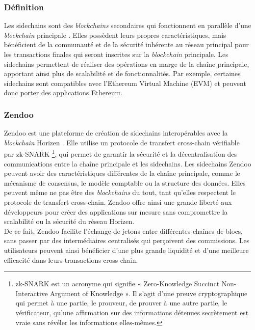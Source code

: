 \subsubsection{Définition}
Les sidechains sont des \textit{blockchains} secondaires qui fonctionnent en parallèle d'une \textit{blockchain} principale \cite{jensen2021introduction,qin2018overview,belchior2022survey}. Elles possèdent leurs propres 
caractéristiques, mais bénéficient de la communauté et de la sécurité inhérente au réseau principal pour les transactions finales qui seront inscrites sur 
la \textit{blockchain} principale. Les sidechains permettent de réaliser des opérations en marge de la chaîne principale, apportant ainsi plus de scalabilité 
et de fonctionnalités. Par exemple, certaines sidechains sont compatibles avec l'Ethereum Virtual Machine (EVM) et peuvent donc porter des applications Ethereum.

\subsubsection{Zendoo}
Zendoo est une plateforme de création de sidechains interopérables avec la \textit{blockchain} Horizen \cite{garoffolo2020zendoo,belchior2022survey}. Elle utilise un protocole 
de transfert cross-chain vérifiable par zk-SNARK \footnote{zk-SNARK est un acronyme qui signifie « Zero-Knowledge Succinct Non-Interactive Argument of Knowledge ». 
Il s'agit d'une preuve cryptographique qui permet à une partie, le prouveur, de prouver à une autre partie, le vérificateur, qu'une affirmation sur des informations 
détenues secrètement est vraie sans révéler les informations elles-mêmes.}, qui permet de garantir la sécurité et la décentralisation des communications entre 
la chaîne principale et les sidechains. Les sidechains Zendoo peuvent avoir des caractéristiques différentes de la chaîne principale, comme le mécanisme de 
consensus, le modèle comptable ou la structure des données. Elles peuvent même ne pas être des \textit{blockchains} du tout, tant qu'elles respectent le protocole 
de transfert cross-chain. Zendoo offre ainsi une grande liberté aux développeurs pour créer des applications sur mesure sans compromettre la scalabilité ou la 
sécurité du réseau Horizen.\\
De ce fait, Zendoo facilite l'échange de jetons entre différentes chaînes de blocs, sans passer par des intermédiaires centralisés qui perçoivent des commissions. 
Les utilisateurs peuvent ainsi bénéficier d'une plus grande liquidité et d'une meilleure efficacité dans leurs transactions cross-chain.

